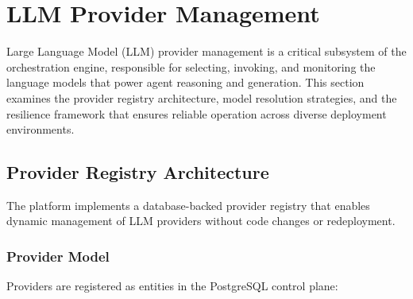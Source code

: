 
\section{LLM Provider Management}
\label{sec:llm-providers}

Large Language Model (LLM) provider management is a critical subsystem of the orchestration engine, responsible for selecting, invoking, and monitoring the language models that power agent reasoning and generation. This section examines the provider registry architecture, model resolution strategies, and the resilience framework that ensures reliable operation across diverse deployment environments.

\subsection{Provider Registry Architecture}

The platform implements a database-backed provider registry that enables dynamic management of LLM providers without code changes or redeployment.

\subsubsection{Provider Model}

Providers are registered as entities in the PostgreSQL control plane:

